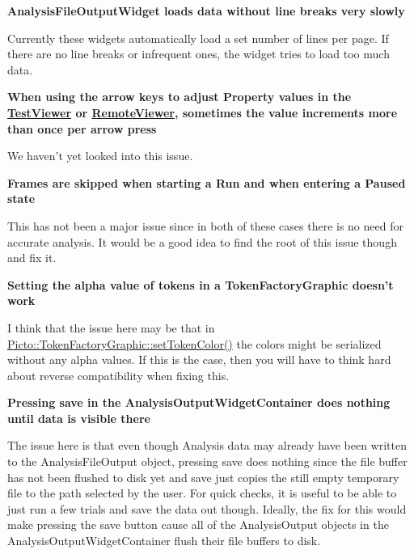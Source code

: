 {\bfseries Analysis\-File\-Output\-Widget loads data without line breaks very slowly}\par
 Currently these widgets automatically load a set number of lines per page. If there are no line breaks or infrequent ones, the widget tries to load too much data.

{\bfseries When using the arrow keys to adjust Property values in the \hyperlink{class_test_viewer}{Test\-Viewer} or \hyperlink{class_remote_viewer}{Remote\-Viewer}, sometimes the value increments more than once per arrow press}\par
 We haven't yet looked into this issue.

{\bfseries Frames are skipped when starting a Run and when entering a Paused state}\par
 This has not been a major issue since in both of these cases there is no need for accurate analysis. It would be a good idea to find the root of this issue though and fix it.

{\bfseries Setting the alpha value of tokens in a Token\-Factory\-Graphic doesn't work}\par
 I think that the issue here may be that in \hyperlink{class_picto_1_1_token_factory_graphic_a2192ff428146627cd30dab0257d0a181}{Picto\-::\-Token\-Factory\-Graphic\-::set\-Token\-Color()} the colors might be serialized without any alpha values. If this is the case, then you will have to think hard about reverse compatibility when fixing this.

{\bfseries Pressing save in the Analysis\-Output\-Widget\-Container does nothing until data is visible there}\par
 The issue here is that even though Analysis data may already have been written to the Analysis\-File\-Output object, pressing save does nothing since the file buffer has not been flushed to disk yet and save just copies the still empty temporary file to the path selected by the user. For quick checks, it is useful to be able to just run a few trials and save the data out though. Ideally, the fix for this would make pressing the save button cause all of the Analysis\-Output objects in the Analysis\-Output\-Widget\-Container flush their file buffers to disk. 